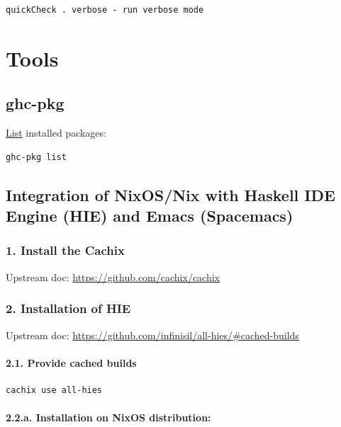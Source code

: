 \documentclass[a4paper,14pt,oneside]{book}
\begin{document}
{\begin{verbatim}
quickCheck . verbose - run verbose mode
\end{verbatim}

\part{Tools}
\label{sec:org10f64f3}
\chapter{ghc-pkg}
\label{sec:orga1389b5}

\hyperref[org47d56c8]{List} installed packages:\\
\begin{verbatim}
ghc-pkg list
\end{verbatim}

\chapter{Integration of NixOS/Nix with Haskell IDE Engine (HIE) and Emacs (Spacemacs)}
\label{sec:orgba9c052}
\section{1. Install the Cachix}
\label{sec:org596e21a}

Upstream doc: \url{https://github.com/cachix/cachix}\\

\section{2. Installation of HIE}
\label{sec:org19f82c4}

Upstream doc: \url{https://github.com/infinisil/all-hies/\#cached-builds}\\

\subsection{2.1. Provide cached builds}
\label{sec:orge7ba74b}

\begin{verbatim}
cachix use all-hies
\end{verbatim}

\subsection{2.2.a. Installation on NixOS distribution:}
\label{sec:org02d7a07}

}
\end{document}
